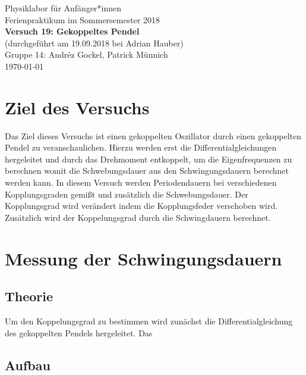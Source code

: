 \documentclass[11pt,a4paper]{article}
\begin{document}
{
\centering 
\large 
Physiklabor für Anf\"anger*innen \\
Ferienpraktikum im Sommersemester 2018 \\[4mm]
\textbf{\LARGE 
Versuch 19: Gekoppeltes Pendel 
} \\[3mm]
(durchgef\"uhrt am 19.09.2018 bei Adrian Hauber) \\
Gruppe 14: Andréz Gockel, Patrick M\"unnich\\
\today \\[10mm]
}

\vspace{50pt}
\tableofcontents
\vspace{22pt}
\listoftables
\vspace{22pt}
\listoffigures
\pagebreak

\section{Ziel des Versuchs}
Das Ziel dieses Versuchs ist einen gekoppelten Oszillator durch einen gekoppelten Pendel zu veranschaulichen. Hierzu werden erst die Differentialgleichungen hergeleitet und durch das Drehmoment entkoppelt, um die Eigenfrequenzen zu berechnen womit die Schwebungsdauer aus den Schwingungsdauern berechnet werden kann. In diesem Versuch werden Periodendauern bei verschiedenen Kopplungsgraden gemißt und zusätzlich die Schwebungsdauer. Der Kopplungsgrad wird verändert indem die Kopplungsfeder verschoben wird. Zusätzlich wird der Koppelungsgrad durch die Schwingdauern berechnet.

\section{Messung der Schwingungsdauern}

\subsection{Theorie}

Um den Koppelungsgrad zu bestimmen wird zunächst die Differentialgleichung des gekoppelten Pendels hergeleitet.
Das 

\subsection{Aufbau}
\end{document}
